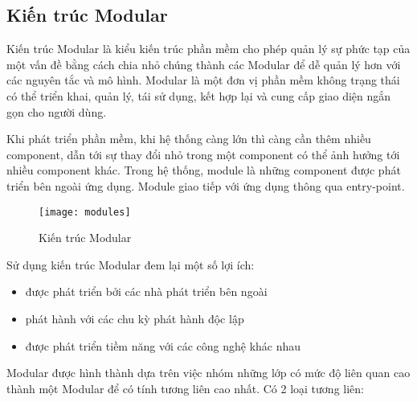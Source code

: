 \subsection{Kiến trúc Modular}

Kiến trúc Modular là kiểu kiến trúc phần mềm cho phép quản lý sự phức tạp của một vấn đề bằng cách chia nhỏ chúng thành các Modular để dễ quản lý hơn với các nguyên tắc và mô hình. Modular là một đơn vị phần mềm không trạng thái có thể triển khai, quản lý, tái sử dụng, kết hợp lại và cung cấp giao diện ngắn gọn cho người dùng.

Khi phát triển phần mềm, khi hệ thống càng lớn thì càng cần thêm nhiều component, dẫn tới sự thay đổi nhỏ trong một component có thể ảnh hưởng tới nhiều component khác. Trong hệ thống, module là những component được phát triển bên ngoài ứng dụng. Module giao tiếp với ứng dụng thông qua entry-point.

\begin{figure}[ht]
	\centering
	\texttt{[image: modules]}
	\caption{Kiến trúc Modular}
\end{figure}

Sử dụng kiến trúc Modular đem lại một số lợi ích:

\begin{itemize}
	\begin{itemize}
		\item được phát triển bởi các nhà phát triển bên ngoài
		\item phát hành với các chu kỳ phát hành độc lập
		\item được phát triển tiềm năng với các công nghệ khác nhau
	\end{itemize}
\end{itemize}

Modular được hình thành dựa trên việc nhóm những lớp có mức độ liên quan cao thành một Modular để có tính tương liên cao nhất. Có 2 loại tương liên:

